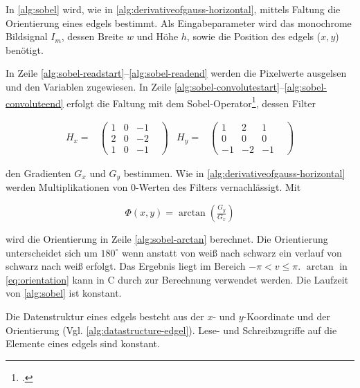 In \autoref{alg:sobel} wird, wie in \autoref{alg:derivativeofgauss-horizontal}, mittels Faltung die Orientierung eines \gls{edgels} bestimmt. Als Eingabeparameter wird das monochrome Bildsignal $I_m$, dessen Breite $w$ und Höhe $h$, sowie die Position des \gls{edgels} ($x,y$) benötigt.



In Zeile \ref{alg:sobel-readstart}--\ref{alg:sobel-readend} werden die Pixelwerte ausgelsen und den Variablen zugewiesen. In Zeile \ref{alg:sobel-convolutestart}--\ref{alg:sobel-convoluteend} erfolgt die Faltung mit dem Sobel-Operator\footcite[Vgl.][S.~120--123]{burger05}, dessen Filter

\begin{subequations}
\begin{align}
	H_x =&
	\begin{pmatrix}
		1& 0& -1&\\
		2& 0& -2&\\
		1& 0& -1
	\end{pmatrix}
\end{align}
\begin{align}
	H_y =&
	\begin{pmatrix}
		1& 2& 1&\\
		0& 0& 0&\\
		-1& -2& -1
	\end{pmatrix}
\end{align}
\end{subequations}

den Gradienten $G_x$ und $G_y$ bestimmen. Wie in \autoref{alg:derivativeofgauss-horizontal} werden Multiplikationen von $0$-Werten des Filters vernachlässigt. Mit

\begin{equation}
	\label{eq:orientation}
	\Phi(x,y) = \arctan{\left(\tfrac{G_y}{G_x}\right)}
\end{equation}

wird die Orientierung in Zeile \autoref{alg:sobel-arctan} berechnet. Die Orientierung unterscheidet sich um $180^\circ$
 wenn anstatt von weiß nach schwarz ein verlauf von schwarz nach weiß erfolgt. Das Ergebnis liegt im Bereich
 $-\pi < v \leq \pi$. $\arctan$ in \autoref{eq:orientation} kann in C durch  zur Berechnung verwendet
 werden. Die Laufzeit von \autoref{alg:sobel} ist konstant.

Die Datenstruktur eines \gls{edgels} besteht aus der $x$- und $y$-Koordinate und der Orientierung
 (Vgl. \autoref{alg:datastructure-edgel}). Lese- und Schreibzugriffe auf die Elemente eines \gls{edgels} sind konstant.

